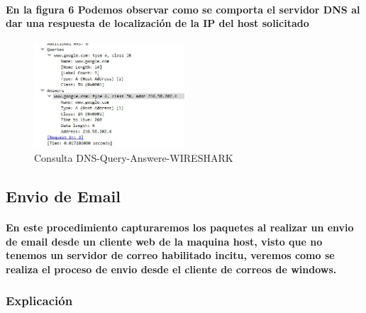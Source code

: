 \documentclass[letterpaper]{article}
\begin{document}
\paragraph{En la figura 6 Podemos observar como se comporta el servidor DNS al dar una respuesta de localización de la IP del host solicitado }

\begin{figure}[h]
	\centering
	\includegraphics[width=0.5\textwidth]{img/dns-2.jpg}
	\caption{Consulta DNS-Query-Answere-WIRESHARK}
	\label{figura 6}
\end{figure}

\newpage

\subsection{Envio de Email}

\paragraph{En este procedimiento capturaremos los paquetes al realizar un envio de email desde un cliente web de la maquina host, visto que no tenemos un servidor de correo habilitado incitu, veremos como se realiza el proceso de envio desde el cliente de correos de windows.}

\subsubsection{Explicación}
\end{document}
